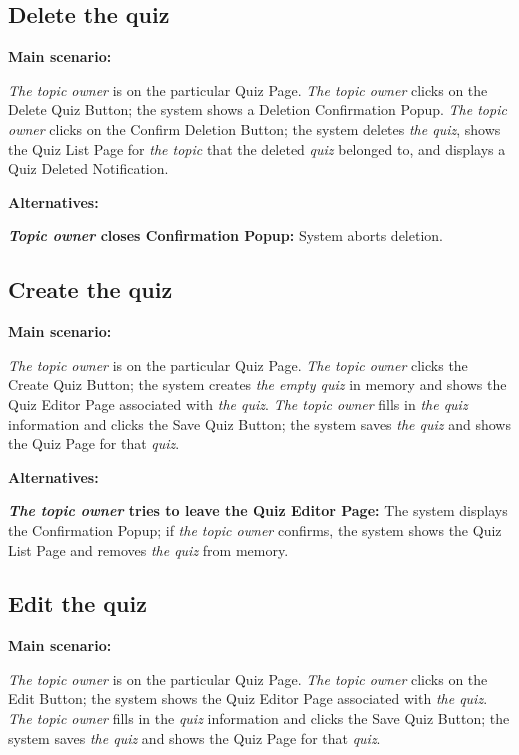 \documentclass[
    english, %
]{VUMIFPSkursinis}
\begin{document}
\subsection{Delete the quiz}

\noindent\textbf{\fontsize{13}{15}\selectfont Main scenario:}

\textit{The topic owner} is on the particular Quiz Page. \textit{The topic owner} clicks on the Delete Quiz Button; the system shows a Deletion Confirmation Popup. \textit{The topic owner} clicks on the Confirm Deletion Button; the system deletes \textit{the quiz}, shows the Quiz List Page for \textit{the topic} that the deleted \textit{quiz} belonged to, and displays a Quiz Deleted Notification.

\noindent\textbf{\fontsize{13}{15}\selectfont Alternatives:}

\textbf{\textit{Topic owner} closes Confirmation Popup:} System aborts deletion.

\subsection{Create the quiz}

\noindent\textbf{\fontsize{13}{15}\selectfont Main scenario:}

\textit{The topic owner} is on the particular Quiz Page. \textit{The topic owner} clicks the Create Quiz Button; the system creates \textit{the empty quiz} in memory and shows the Quiz Editor Page associated with \textit{the quiz}. \textit{The topic owner} fills in \textit{the quiz} information and clicks the Save Quiz Button; the system saves \textit{the quiz} and shows the Quiz Page for that \textit{quiz}.

\noindent\textbf{\fontsize{13}{15}\selectfont Alternatives:}

\textbf{\textit{The topic owner} tries to leave the Quiz Editor Page:} The system displays the Confirmation Popup; if \textit{the topic owner} confirms, the system shows the Quiz List Page and removes \textit{the quiz} from memory.

\subsection{Edit the quiz}

\noindent\textbf{\fontsize{13}{15}\selectfont Main scenario:}

\textit{The topic owner} is on the particular Quiz Page. \textit{The topic owner} clicks on the Edit Button; the system shows the Quiz Editor Page associated with \textit{the quiz}. \textit{The topic owner} fills in the \textit{quiz} information and clicks the Save Quiz Button; the system saves \textit{the quiz} and shows the Quiz Page for that \textit{quiz}.
\end{document}
